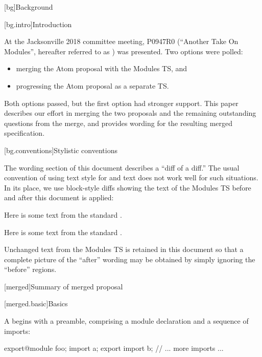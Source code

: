\setcounter{chapter}{0}
[bg]{Background}

[bg.intro]{Introduction}

At the Jacksonville 2018 committee meeting,
P0947R0 (``Another Take On Modules'',
hereafter referred to as )
was presented. Two options were polled:

\begin{itemize}
\item merging the Atom proposal with the Modules TS, and
\item progressing the Atom proposal as a separate TS.
\end{itemize}

Both options passed, but the first option had stronger support.
This paper describes our effort in merging the two proposals
and the remaining outstanding questions from the merge,
and provides wording for the resulting merged specification.

[bg.conventions]{Stylistic conventions}

The wording section of this document describes a ``diff of a diff.''
The usual convention of using text style for  and
 text does not work well for such situations.
In its place, we use block-style diffs
showing the text of the Modules TS
before and after this document is applied:

\begin{before}
Here is some text from the \Cpp standard
.
\end{before}

\begin{after}
Here is some text from the \Cpp standard
.
\end{after}

Unchanged text from the Modules TS is retained in this document so that a
complete picture of the ``after'' wording may be obtained by simply ignoring
the ``before'' regions.

[merged]{Summary of merged proposal}

[merged.basic]{Basics}

\pnum
A  begins with a preamble,
comprising a module declaration
and a sequence of imports:

\begin{codeblock}
export@\opt@ module foo;
import a;
export import b;
// ... more imports ...
\end{codeblock}

